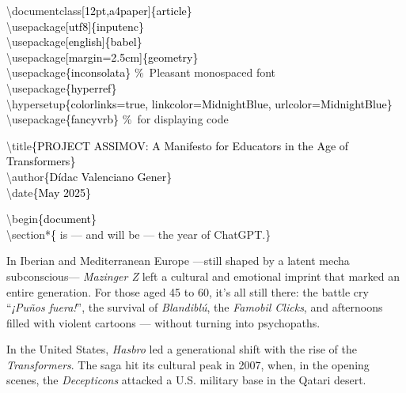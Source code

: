 \documentclass[12pt,a4paper]{article}
\title{}
\author{}
\date{}
\begin{document}
\noindent
\ttfamily
\textcolor{mygreen}{\textbackslash documentclass}\textcolor{black}{[12pt,a4paper]\{article\}}\\
\textcolor{mygreen}{\textbackslash usepackage}\textcolor{black}{[utf8]\{inputenc\}}\\
\textcolor{mygreen}{\textbackslash usepackage}\textcolor{black}{[english]\{babel\}}\\
\textcolor{mygreen}{\textbackslash usepackage}\textcolor{black}{[margin=2.5cm]\{geometry\}}\\
\textcolor{mygreen}{\textbackslash usepackage}\textcolor{black}{\{inconsolata\}} \textcolor{mygray}{\%\ Pleasant monospaced font}\\
\textcolor{mygreen}{\textbackslash usepackage}\textcolor{black}{\{hyperref\}}\\
\textcolor{mygreen}{\textbackslash hypersetup}\textcolor{black}{\{colorlinks=true, linkcolor=MidnightBlue, urlcolor=MidnightBlue\}}\\
\textcolor{mygreen}{\textbackslash usepackage}\textcolor{black}{\{fancyvrb\}} \textcolor{mygray}{\%\ for displaying code}

\medskip

\noindent\textcolor{mygreen}{\textbackslash title}\textcolor{black}{\{PROJECT ASSIMOV: A Manifesto for Educators in the Age of Transformers\}}\\
\textcolor{mygreen}{\textbackslash author}\textcolor{black}{\{Dídac Valenciano Gener\}}\\
\textcolor{mygreen}{\textbackslash date}\textcolor{black}{\{May 2025\}}

\medskip

\noindent\textcolor{mygreen}{\textbackslash begin}\textcolor{black}{\{document\}}\\
\textcolor{mygreen}{\textbackslash section*}\textcolor{black} \{ is — and will be — the year of ChatGPT.\}\\

				
\medskip

In Iberian and Mediterranean Europe —still shaped by a latent mecha subconscious— \emph{Mazinger Z} left a cultural and emotional imprint that marked an entire generation. For those aged 45 to 60, it’s all still there: the battle cry “\emph{¡Puños fuera!}”, the survival of \emph{Blandiblú}, the \emph{Famobil Clicks}, and afternoons filled with violent cartoons — without turning into psychopaths.

\medskip

In the United States, \emph{Hasbro} led a generational shift with the rise of the \emph{Transformers}. The saga hit its cultural peak in 2007, when, in the opening scenes, the \emph{Decepticons} attacked a U.S. military base in the Qatari desert.
\end{document}
